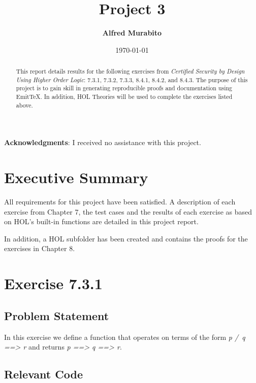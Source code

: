 \documentclass[letterpaper]{report}
\title{Project 3}
\author{\textbf{Alfred Murabito}}
\date{\today}
\begin{document}
\maketitle{}

\begin{abstract}
   \noindent{}This report details results for the following exercises from \textit{Certified Security by Design Using Higher Order Logic}: 7.3.1, 7.3.2, 7.3.3, 8.4.1, 8.4.2, and 8.4.3.  The purpose of this project is to gain skill in generating reproducible proofs and documentation using EmitTeX.  In addition, HOL Theories will be used to complete the exercises listed above.
\end{abstract}

\newpage

\textbf{Acknowledgments}: I received no assistance with this project.

\newpage

\tableofcontents


\newpage

\chapter{Executive Summary}
\label{sec:executive-summary}

All requirements for this project have been satisfied.  A description of each exercise from Chapter 7, the test cases and the results of each exercise as based on HOL's built-in functions are detailed in this project report.  

In addition, a HOL subfolder has been created and contains the proofs for the exercises in Chapter 8.  

\newpage

\chapter{Exercise 7.3.1}
\label{sec:ex-7-3-1}

\section{Problem Statement}
In this exercise we define a function that operates on terms of the form \textit{p /\ q ==> r} and returns \textit{p ==> q ==> r}.

\section{Relevant Code}
\label{sec:relevantCode}
\end{document}
